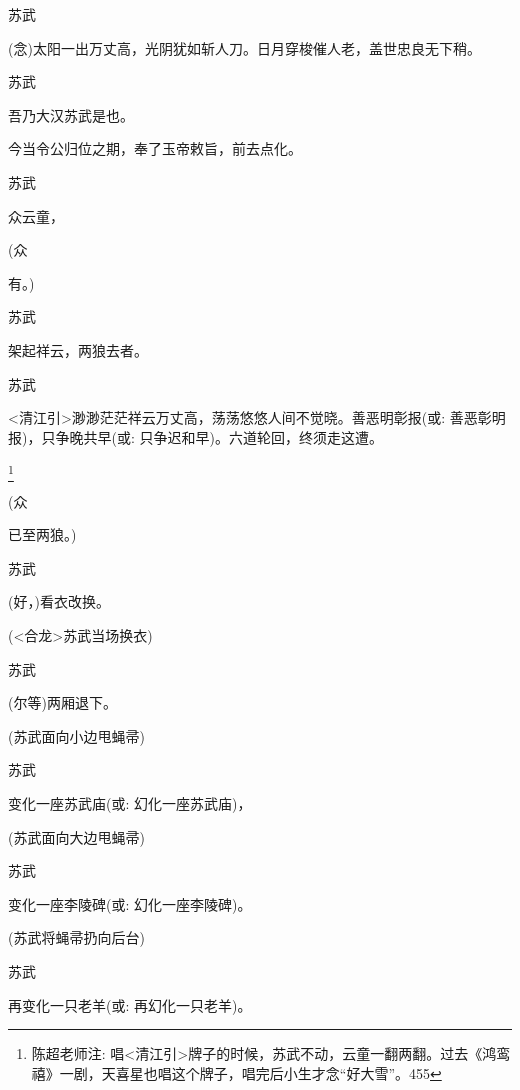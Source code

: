 {{苏武

({\akai 念})太阳一出万丈高，光阴犹如斩人刀。日月穿梭催人老，盖世忠良无下稍。}

{苏武\hspace{30pt}~

吾乃大汉苏武是也。

今当令公归位之期，奉了玉帝敕旨，前去点化。}

{苏武\hspace{30pt}~

众云童，}

{(众\hspace{40pt}~

有。)}

{苏武\hspace{30pt}~

架起祥云，两狼去者。}

{苏武

\textless{}清江引\textgreater{}渺渺茫茫祥云万丈高，荡荡悠悠人间不觉晓。善恶明彰报({\akai 或}: 善恶彰明报)，只争晚共早({\akai 或}: 只争迟和早)。六道轮回，终须走这遭。}\footnote{ 陈超老师注: {唱\textless{}清江引\textgreater{}牌子的时候，苏武不动，云童一翻两翻。过去《鸿鸾禧》一剧，天喜星也唱这个牌子，唱完后小生才念``好大雪''。}{455}}

{(众\hspace{40pt}~

已至两狼。)}

{苏武\hspace{30pt}~

(好，)看衣改换。}

{(\textless{}合龙\textgreater{}苏武当场换衣)}

{苏武\hspace{30pt}~

(尔等)两厢退下。}

{(苏武面向小边甩蝇帚)}

{苏武\hspace{30pt}~

变化一座苏武庙({\akai 或}: 幻化一座苏武庙)，}

{(苏武面向大边甩蝇帚)}

{苏武\hspace{30pt}~

变化一座李陵碑({\akai 或}: 幻化一座李陵碑)。}

{(苏武将蝇帚扔向后台)}

{苏武\hspace{30pt}~

再变化一只老羊({\akai 或}: 再幻化一只老羊)。}

}
